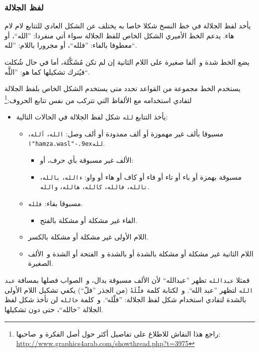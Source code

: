 \documentclass[a4paper]{article}
\newcommand  \T[1]{\colorbox{codecolor}{\texttt{#1}}}   %
\begin{document}
\subsubsection{لفظ الجلالة}
يأخد لفظ الجلالة في خط النسخ شكلا خاصا به يختلف عن الشكل العادي للتتابع
لام لام هاء. يدعم الخط الأميري الشكل الخاص للفظ الجلالة سواء أتي منفردا:
”الله“، أو معطوفا بالفاء: ”فلله“، أو مجرورا باللام: ”لله“.

يضع الخط شدة و ألفا صغيرة على اللام الثانية إن لم تكن مُشَكَّلة، أما في
حال شُكلت فيُترك تشكيلها كما هو: ”اللَّه“.

يستخدم الخط مجموعة من القواعد تحدد متى يستخدم الشكل الخاص بلفظ الجلالة
لتفادي استخدامه مع الألفاظ التي تتركب من نفس تتابع الحروف:\footnote{راجع
هذا النقاش للاطلاع على تفاصيل أكثر حول أصل الفكرة و صاحبها:
\url{http://www.graphics4arab.com/showthread.php?t=3975}}

\def\ٱ{ا\textrm{\XeTeXglyph\XeTeXglyphindex "hamza.wasl"}\kern-.9ex}

\begin{itemize}
\item
  يأخذ التتابع \T{لله} شكل لفظ الجلالة في الحالات التالية:
  \begin{itemize}
  \item
    مسبوقا بألف غير مهموزة أو ألف ممدودة أو ألف وصل: \T{الله}،
    \T{آلله}، \T{\ٱ{}لله}.
    \begin{itemize}
    \item
      الألف غير مسبوقة بأي حرف، أو:
    \item
      مسبوقة بهمزة أو باء أو تاء أو فاء أو كاف أو هاء أو واو:
      \T{ءالله}، \T{بالله}، \T{تالله}، \T{فالله}،
      \T{كالله}، \T{هالله}، \T{والله}.
    \end{itemize}
  \item
    مسبوقا بفاء: \T{فلله}.
    \begin{itemize}
    \item
      الفاء غير مشكلة أو مشكلة بالفتح.
    \end{itemize}
  \item
    اللام الأولى غير مشكلة أو مشكلة بالكسر.
  \item
    اللام الثانية غير مشكلة أو مشكلة بالشدة أو بالشدة و الفتحة أو الشدة
    و الألف الصغيرة.
  \end{itemize}
\end{itemize}

فمثلا \T{عبدالله} تظهر ”عبدالله“ لأن الألف مسبوقة بدال، و الصواب
فصلها بمسافة \T{عبد الله} لتظهر ”عبد الله“. و لكتابة كلمة
\T{فلَّلَهُ} (من الجذر ”فلّ“) يكفي تشكيل اللام الأولى بالشدة
لتفادي استخدام شكل لفظ الجلالة: ”فلّله“. و كلمة \T{خالله} لن تأخذ
شكل لفظ الجلالة ”خالله“، حتى دون تشكيلها.
\end{document}
